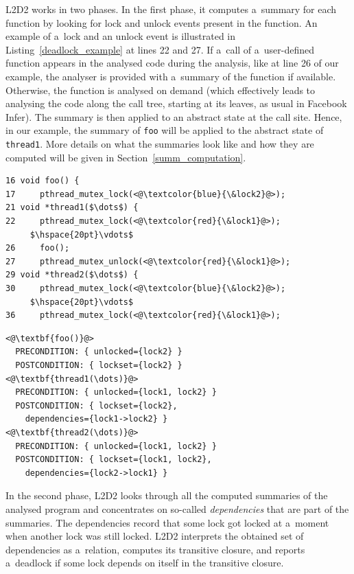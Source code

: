 \documentclass{ExcelAtFIT}
\renewcommand\vdots{\vbox{%
    \baselineskip3pt\lineskiplimit0pt\kern1pt%
    \hbox{.}\hbox{.}\hbox{.}\kern-1pt%
}}
\begin{document}
L2D2 works in two phases. In the first phase, it computes a~summary for each function by looking for lock and unlock events present in the function. An example of a~lock and an unlock event is illustrated in Listing~\ref{deadlock_example} at lines 22 and 27. If a~call of a~user-defined function appears in the analysed code during the analysis, like at line 26 of our example, the analyser is provided with a~summary of the function if available. Otherwise, the function is analysed on demand (which effectively leads to analysing the code along the call tree, starting at its leaves, as usual in Facebook Infer). The summary is then applied to an abstract state at the call site. Hence, in our example, the summary of \texttt{foo} will be applied to the abstract state of \texttt{thread1}. More details on what the summaries look like and how they are computed will be given in Section~\ref{summ_computation}.
\begin{lstlisting}[float=tp, belowskip=-1.5 \baselineskip, caption= A~simple example capturing a~deadlock between two global locks in the C~language using the POSIX threads execution model,
label={deadlock_example}, mathescape=true]
16 void foo() {
17     pthread_mutex_lock(<@\textcolor{blue}{\&lock2}@>);
21 void *thread1($\dots$) {
22     pthread_mutex_lock(<@\textcolor{red}{\&lock1}@>);
     $\hspace{20pt}\vdots$
26     foo();
27     pthread_mutex_unlock(<@\textcolor{red}{\&lock1}@>);
29 void *thread2($\dots$) {
30     pthread_mutex_lock(<@\textcolor{blue}{\&lock2}@>);
     $\hspace{20pt}\vdots$
36     pthread_mutex_lock(<@\textcolor{red}{\&lock1}@>);
\end{lstlisting}
\begin{lstlisting}[float=bp, aboveskip=-1 \baselineskip, label={deadlock_example_summary}, caption=Summaries of the functions in Listing~\ref{deadlock_example}]
<@\textbf{foo()}@>
  PRECONDITION: { unlocked={lock2} }
  POSTCONDITION: { lockset={lock2} }
<@\textbf{thread1(\dots)}@>
  PRECONDITION: { unlocked={lock1, lock2} }
  POSTCONDITION: { lockset={lock2},
    dependencies={lock1->lock2} }
<@\textbf{thread2(\dots)}@>
  PRECONDITION: { unlocked={lock1, lock2} }
  POSTCONDITION: { lockset={lock1, lock2},
    dependencies={lock2->lock1} }
\end{lstlisting}

In the second phase, L2D2 looks through all the computed summaries of the analysed program and concentrates on so-called \textit{dependencies} that are part of the summaries. The dependencies record that some lock got locked at a~moment when another lock was still locked. L2D2 interprets the obtained set of dependencies as a~relation, computes its transitive closure, and reports a~deadlock if some lock depends on itself in the transitive closure.
\end{document}
